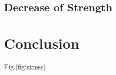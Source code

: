 \documentclass[final,5p,times,twocolumn]{elsarticle}
\begin{document}
\subsection{Decrease of Strength}


\section{Conclusion}





Fig.\ref{fig:stress}.
\end{document}
